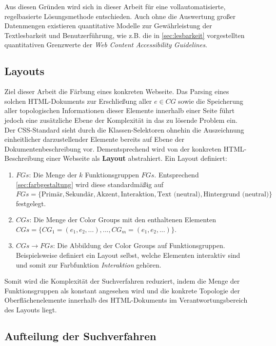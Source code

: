 Aus diesen Gründen wird sich in dieser Arbeit für eine vollautomatisierte, regelbasierte Lösungsmethode entschieden. Auch ohne die Auswertung großer Datenmengen existieren quantitative Modelle zur Gewährleistung der Textlesbarkeit und Benutzerführung, wie z.B. die in \ref{sec:lesbarkeit} vorgestellten quantitativen Grenzwerte der \emph{Web Content Accessibility Guidelines}.

\subsection{Layouts}
\label{sec:layouts}

Ziel dieser Arbeit die Färbung eines konkreten Webseite. Das Parsing eines solchen HTML-Dokuments zur Erschließung aller $e \in CG$ sowie die Speicherung aller topologischen Informationen dieser Elemente innerhalb einer Seite führt jedoch eine zusätzliche Ebene der Komplexität in das zu lösende Problem ein. Der CSS-Standard sieht durch die Klassen-Selektoren \citep{css3-selectors} ohnehin die Auszeichnung einheitlicher darzustellender Elemente bereits auf Ebene der Dokumentenbeschreibung vor. Dementsprechend wird von der konkreten HTML-Beschreibung einer Webseite als  \textbf{Layout} abstrahiert. Ein Layout definiert:

\begin{enumerate}
	\item $FGs$: Die Menge der $k$ Funktionsgruppen $FGs$. Entsprechend \autoref{sec:farbgestaltung} wird diese standardmäßig auf $FGs = \{\text{Primär}, \text{Sekundär}, \text{Akzent}, \text{Interaktion}, \text{Text (neutral)}, \text{Hintergrund (neutral)}\}$ festgelegt.
	\item $CGs$: Die Menge der Color Groups mit den enthaltenen Elementen $CGs = \{CG_1 = (e_1, e_2, ...), ..., CG_m = (e_1, e_2, ...)\}$.
 	\item $CGs \to FGs$: Die Abbildung der Color Groups auf Funktionsgruppen. Beispielsweise definiert ein Layout selbst, welche Elementen interaktiv sind und somit zur Farbfunktion \emph{Interaktion} gehören.
\end{enumerate}

Somit wird die Komplexität der Suchverfahren reduziert, indem die Menge der Funktionsgruppen als konstant angesehen wird und die konkrete Topologie der Oberflächenelemente innerhalb des HTML-Dokuments im Verantwortungsbereich des Layouts liegt.

\subsection{Aufteilung der Suchverfahren}
\label{sec:aufteilung}

